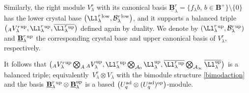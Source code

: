 Similarly, the right module $V_\lambda^r$ with its canonical basis $\underline{\mathbf{B}}_\lambda^r{}=\{f_\lambda b,\, b\in \mathbf{B}^+\}\setminus \{0\}$ has the lower crystal base $\big(\Ll_{\lambda}^r{}^{\rm low},\mathcal{B}_\lambda^r{}^{\rm low}\big)$, and it supports a balanced triple $\big({}_AV_\lambda^r{}^{\rm up},\Ll_{\lambda} ^r{}^{\rm up},\overline{\Ll_{\lambda} ^r{}^{\rm up}}\big)$ defined again by duality. We denote by $(\Ll_{\lambda}^r{}^{\rm up},\mathcal{B}_\lambda^r{}^{\rm up})$ and $\underline{\mathbf{B}}_\lambda^r{}^{\rm up}$ the corresponding crystal base and upper canonical basis of $V_\lambda^r$, respectively.

It follows that $\big({}_AV_\lambda^r{}^{\rm up}\bigotimes_A {}_AV_\lambda^{\rm up},\Ll_{\lambda}^r{}^{\rm up} \bigotimes_{\mathcal{A}_0}\Ll_{\lambda}^{\rm up},\overline{\Ll_{\lambda}^r{}^{\rm up}}\bigotimes_{\mathcal{A}_\infty}\overline{\Ll_{\lambda}^{\rm up}}\big)$ is a balanced triple; equivalently~${V_\lambda^r \otimes V_\lambda}$ with the bimodule structure \eqref{bimodaction} and the basis $\underline{\mathbf{B}}_\lambda^r{}^{\rm up}\otimes \underline{\mathbf{B}}_\lambda^{\rm up}$ is a based $\big(U_q^{\rm ad} \otimes (U_q^{\rm ad})^{\rm op}\big)$-module.

